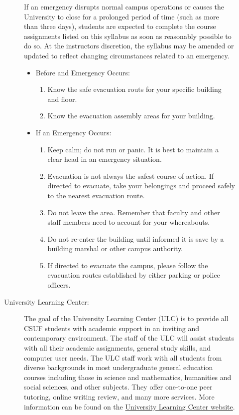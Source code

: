 \documentclass[11pt]{article}
\begin{document}
\begin{description}
\begin{description}
		If an emergency disrupts normal campus operations or causes the University to close for a prolonged period of time (such as more than three days), students are expected to complete the course assignments listed on this syllabus as soon as reasonably possible to do so. At the instructors discretion, the syllabus may be amended or updated to reflect changing circumstances related to an emergency.
		
		\begin{itemize}
			\item[] Before and Emergency Occurs:
				\begin{enumerate}
					\item Know the safe evacuation routs for your specific building and floor.
					\item Know the evacuation assembly areas for your building.
				\end{enumerate} 
			\item[] If an Emergency Occurs:
				\begin{enumerate}
					\item Keep calm; do not run or panic. It is best to maintain a clear head in an emergency situation.
					\item Evacuation is not always the safest course of action. If directed to evacuate, take your belongings and proceed safely to the nearest evacuation route. 
					\item Do not leave the area. Remember that faculty and other staff members need to account for your whereabouts.
					\item Do not re-enter the building until informed it is save by a building marshal or other campus authority.
					\item If directed to evacuate the campus, please follow the evacuation routes established by either parking or police officers. 
				\end{enumerate}
		\end{itemize}
		
		\item[University Learning Center:] The goal of the University Learning Center (ULC) is to provide all CSUF students with academic support in an inviting and contemporary environment. The staff of the ULC will assist students with all their academic assignments, general study skills, and computer user needs. The ULC staff work with all students from diverse backgrounds in most undergraduate general education courses including those in science and mathematics, humanities and social sciences, and other subjects. They offer one-to-one peer tutoring, online writing review, and many more services. More information can be found on the \href{http://www.fullerton.edu/ulc/}{University Learning Center website}.
		

\end{description}
\end{description}
\end{document}
